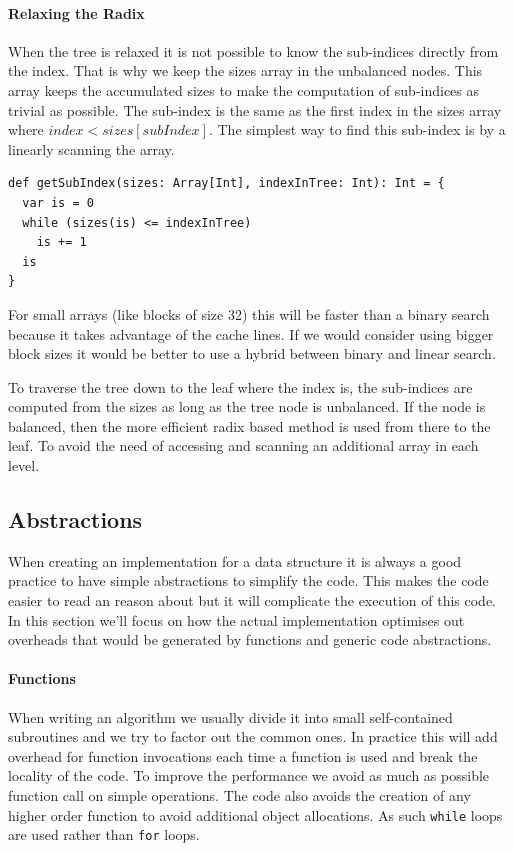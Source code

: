 \paragraph{Relaxing the Radix}
When the tree is relaxed it is not possible to know the sub-indices directly from the index. That is why we keep the sizes array in the unbalanced nodes. This array keeps the accumulated sizes to make the computation of sub-indices as trivial as possible. The sub-index is the same as the first index in the sizes array where $index < sizes[subIndex]$. The simplest way to find this sub-index is by a linearly scanning the array. 

\begin{lstlisting}[frame=single]
def getSubIndex(sizes: Array[Int], indexInTree: Int): Int = {
  var is = 0
  while (sizes(is) <= indexInTree)
    is += 1
  is
}
\end{lstlisting}

For small arrays (like blocks of size 32) this will be faster than a binary search because it takes advantage of the cache lines. If we would consider using bigger block sizes it would be better to use a hybrid between binary and linear search.

To traverse the tree down to the leaf where the index is, the sub-indices are computed from the sizes as long as the tree node is unbalanced. If the node is balanced, then the more efficient radix based method is used from there to the leaf. To avoid the need of accessing and scanning an additional array in each level.



\subsection{Abstractions}
\label{sec:Abstractions}
When creating an implementation for a data structure it is always a good practice to have simple abstractions to simplify the code. This makes the code easier to read an reason about but it will complicate the execution of this code. In this section we'll focus on how the actual implementation optimises out overheads that would be generated by functions and generic code abstractions.

\paragraph{Functions} When writing an algorithm we usually divide it into small self-contained subroutines and we try to factor out the common ones. In practice this will add overhead for function invocations each time a function is used and break the locality of the code. To improve the performance we avoid as much as possible function call on simple operations. The code also avoids the creation of any higher order function to avoid additional object allocations. As such \texttt{while} loops are used rather than \texttt{for} loops.

